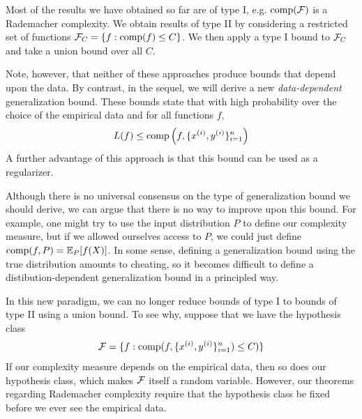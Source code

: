 \begin{remark}
    Most of the results we have obtained so far are of type I, e.g. $\text{comp}(\cF)$ is a Rademacher complexity. We obtain results of type II by considering a restricted set of functions $\cF_C = \{f : \text{comp}(f) \leq C\}$. We then apply a type I bound to $\cF_C$ and take a union bound over all $C$.
\end{remark}

Note, however, that neither of these approaches produce bounds that depend upon the data. By contrast, in the sequel, we will derive a new \textit{data-dependent} generalization bound. These bounds state that with high probability over the choice of the empirical data and for all functions $f$, 
\begin{align}
    L(f) \leq \text{comp}\left (f, \{x\sp{i}, y\sp{i}\}_{i = 1}^n\right)
\end{align}
A further advantage of this approach is that this bound can be used as a regularizer.

\begin{remark}
Although there is no universal consensus on the type of generalization bound we should derive, we can argue that there is no way to improve upon this bound. For example, one might try to use the input distribution $P$ to define our complexity measure, but if we allowed ourselves access to $P$, we could just define $\text{comp}(f, P) = \Exp_P[f(X)]$. In some sense, defining a generalization bound using the true distribution amounts to cheating, so it becomes difficult to define a distibution-dependent generalization bound in a principled way.
\end{remark}

In this new paradigm, we can no longer reduce bounds of type I to bounds of type II using a union bound. To see why, suppose that we have the hypothesis class
\begin{align}
    \cF = \{f: \text{comp}(f, \{x\sp{i}, y\sp{i}\}_{i=1}^n) \leq C)\}
\end{align}
If our complexity measure depends on the empirical data, then so does our hypothesis class, which makes $\cF$ itself a random variable. However, our theorems regarding Rademacher complexity require that the hypothesis class be fixed before we ever see the empirical data.

